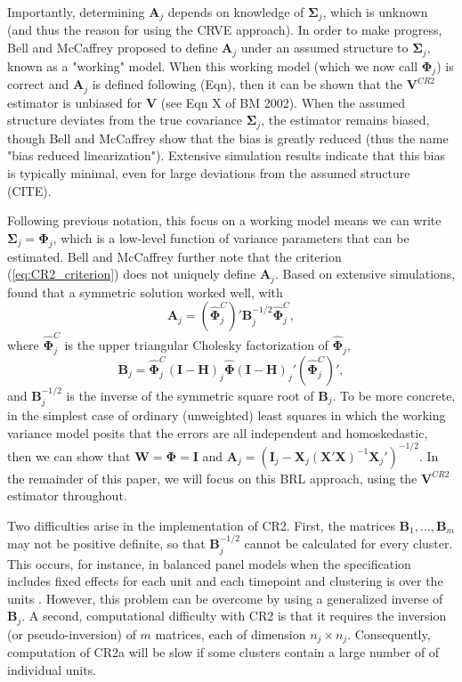 \documentclass[12pt]{article}\usepackage[]{graphicx}\usepackage[]{color}
\newcommand{\bm}{\mathbf}
\newcommand{\bs}{\boldsymbol}
\begin{document}
Importantly, determining $\bm{A}_j$ depends on knowledge of $\bs{\Sigma}_j$, which is unknown (and thus the reason for using the CRVE approach). In order to make progress, Bell and McCaffrey proposed to define $\bm{A}_j$ under an assumed structure to $\bs{\Sigma}_j$, known as a "working" model. When this working model (which we now call $\bs\Phi_j$) is correct and $\bm{A}_j$ is defined following (Eqn), then it can be shown that the $\bm{V}^{CR2}$ estimator is unbiased for $\bm{V}$ (see Eqn X of BM 2002). When the assumed structure deviates from the true covariance $\bs{\Sigma}_j$, the estimator remains biased, though Bell and McCaffrey show that the bias is greatly reduced (thus the name "bias reduced linearization"). Extensive simulation results indicate that this bias is typically minimal, even for large deviations from the assumed structure (CITE).

Following previous notation, this focus on a working model means we can write $\bs{\Sigma}_j = \bs{\Phi}_j$, which is a low-level function of variance parameters that can be estimated. Bell and McCaffrey further note that the criterion (\ref{eq:CR2_criterion}) does not uniquely define $\bm{A}_j$. Based on extensive simulations, \citet{McCaffrey2001generalizations} found that a symmetric solution worked well, with 
\begin{equation}
\label{eq:CR2_adjustment}
\bm{A}_j = \left(\hat{\bs\Phi}_j^C\right)' \bm{B}_j^{-1/2}\hat{\bs\Phi}_j^C,
\end{equation}
where $\hat{\bs\Phi}_j^C$ is the upper triangular Cholesky factorization of $\hat{\bs\Phi}_j$, 
\begin{equation}
\label{eq:CR2_Bmatrix}
\bm{B}_j = \hat{\bs\Phi}_j^C\left(\bm{I} - \bm{H}\right)_j \hat{\bs\Phi} \left(\bm{I} - \bm{H}\right)_j' \left(\hat{\bs\Phi}_j^C\right)',
\end{equation}
and $\bm{B}_j^{-1/2}$ is the inverse of the symmetric square root of $\bm{B}_j $. To be more concrete, in the simplest case of ordinary (unweighted) least squares in which the working variance model posits that the errors are all independent and homoskedastic, then we can show that $\bm{W} = \bs\Phi = \bm{I}$ and $\bm{A}_j = \left(\bm{I}_j - \bm{X}_j\left(\bm{X}'\bm{X}\right)^{-1}\bm{X}_j'\right)^{-1/2}$. In the remainder of this paper, we will focus on this BRL approach, using the $\bm{V}^{CR2}$ estimator throughout. 

Two difficulties arise in the implementation of CR2.
First, the matrices $\bm{B}_1,...,\bm{B}_m$ may not be positive definite, so that $\bm{B}_j^{-1/2}$ cannot be calculated for every cluster. 
This occurs, for instance, in balanced panel models when the specification includes fixed effects for each unit and each timepoint and clustering is over the units \citep[p. 320]{Angrist2009mostly}. 
However, this problem can be overcome by using a generalized inverse of $\bm{B}_j$.
A second, computational difficulty with CR2 is that it requires the inversion (or pseudo-inversion) of $m$ matrices, each of dimension $n_j \times n_j$. 
Consequently, computation of CR2a will be slow if some clusters contain a large number of of individual units. 
\end{document}
